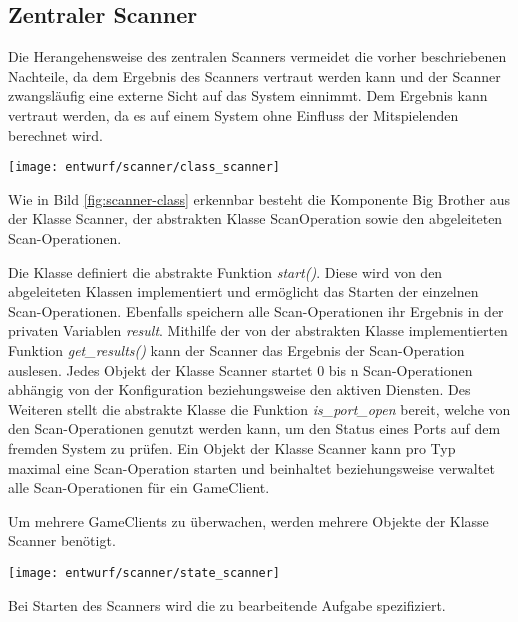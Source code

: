 \subsection{Zentraler Scanner}
Die Herangehensweise des zentralen Scanners vermeidet die vorher beschriebenen Nachteile, da dem Ergebnis des Scanners vertraut werden kann und der Scanner zwangsläufig eine externe Sicht auf das System einnimmt. Dem Ergebnis kann vertraut werden, da es auf einem System ohne Einfluss der Mitspielenden berechnet wird.

\begin{center}
	\texttt{[image: entwurf/scanner/class\_scanner]}
	\label{fig:scanner-class}
\end{center}

Wie in Bild \ref{fig:scanner-class} erkennbar besteht die Komponente Big Brother aus der Klasse Scanner, der abstrakten Klasse ScanOperation sowie den abgeleiteten Scan-Operationen.

Die Klasse  definiert die abstrakte Funktion \textit{start()}. Diese wird von den abgeleiteten Klassen implementiert und ermöglicht das Starten der einzelnen Scan-Operationen. Ebenfalls speichern alle Scan-Operationen ihr Ergebnis in der privaten Variablen \textit{result}. Mithilfe der von der abstrakten Klasse implementierten Funktion \textit{get\_results()} kann der Scanner das Ergebnis der Scan-Operation auslesen. Jedes Objekt der Klasse Scanner startet 0 bis n Scan-Operationen abhängig von der Konfiguration beziehungsweise den aktiven Diensten. Des Weiteren stellt die abstrakte Klasse die Funktion \textit{is\_port\_open} bereit, welche von den Scan-Operationen genutzt werden kann, um den Status eines Ports auf dem fremden System zu prüfen. Ein Objekt der Klasse Scanner kann pro Typ maximal eine Scan-Operation starten und beinhaltet beziehungsweise verwaltet alle Scan-Operationen für ein GameClient. 

Um mehrere GameClients zu überwachen, werden mehrere Objekte der Klasse Scanner benötigt.

\begin{center}
	\texttt{[image: entwurf/scanner/state\_scanner]}
	\label{fig:scanner-state}
\end{center}

Bei Starten des Scanners wird die zu bearbeitende Aufgabe spezifiziert.

